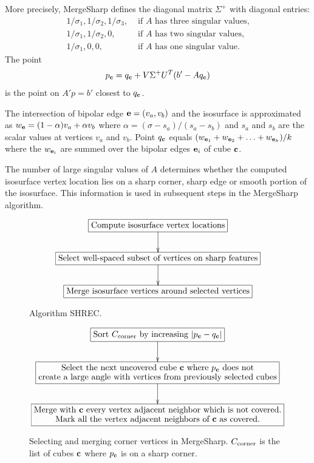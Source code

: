 More precisely, MergeSharp defines the diagonal matrix $\Sigma^+$
with diagonal entries:
\begin{equation*}
\begin{array}{ll}
1/\sigma_1, 1/\sigma_2, 1/\sigma_3, 
  & \mbox{ if $A$ has three singular values,}\\
1/\sigma_1, 1/\sigma_2, 0, 
  & \mbox{ if $A$ has two singular values,}\\
1/\sigma_1, 0, 0, 
  & \mbox{ if $A$ has one singular value.}
\end{array}
\end{equation*}
The point
\begin{equation}
\label{eqn:Lindstrom}
p_{\mathbf{c}} = q_{\mathbf{c}} + V \Sigma^+ U^T (b' - A q_{\mathbf{c}}) 
\end{equation}
is the point on $A' p = b'$ closest to $q_{\mathbf{c}}$.

The intersection of bipolar edge $\mathbf{e} = (v_a,v_b)$ and the isosurface
is approximated as $w_{\mathbf{e}} = (1-\alpha) v_a + \alpha v_b$
where $\alpha = (\sigma - s_a)/(s_a-s_b)$
and $s_a$ and $s_b$ are the scalar values at vertices $v_a$ and $v_b$.
Point $q_{\mathbf{c}}$ equals $(w_{\mathbf{e}_1}+w_{\mathbf{e}_2}+\ldots+w_{\mathbf{e}_k})/k$
where the $w_{\mathbf{e}_i}$ are summed 
over the bipolar edges $\mathbf{e}_i$ of cube $\mathbf{c}$.

The number of large singular values of $A$ determines
whether the computed isosurface vertex location lies 
on a sharp corner, sharp edge or smooth portion of the isosurface.
This information is used in subsequent steps in the MergeSharp algorithm.

\begin{figure}
\begin{equation*}
\xymatrix{
\action{Compute isosurface vertex locations} \ar[d] \\
\action{Select well-spaced subset of vertices on sharp features} \ar[d] \\
\action{Merge isosurface vertices around selected vertices}
}
\end{equation*}
\caption{Algorithm SHREC.}
\label{alg:mergesharp}
\end{figure}

\begin{figure}
\begin{equation*}
\xymatrix{
\action{Sort $\Ccorner$ by increasing $|p_\cb-q_\cb|$} \ar[d] \\
\action{Select the next uncovered cube $\cb$ where $p_\cb$ does not\\
create a large angle with vertices from previously selected cubes} \ar[d] \\
\action{Merge with $\cb$ every vertex adjacent neighbor
which is not covered.\\
Mark all the vertex adjacent neighbors of $\cb$ as covered.}
}
\end{equation*}
\caption{Selecting and merging corner vertices in MergeSharp.
$C_{\mathrm{corner}}$ is the list of cubes $\mathbf{c}$ where $p_{\mathbf{c}}$ is on a sharp corner.}
\label{alg:select}
\end{figure}


